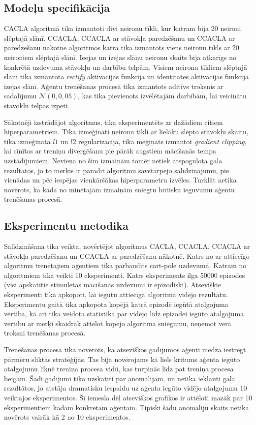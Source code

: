 \documentclass{ludis} %
\begin{document}
\subsection{Modeļu specifikācija}
CACLA algoritmā tika izmantoti divi neironu tīkli, kur katram bija 20
neironi slēptajā slānī. CCACLA, CCACLA ar stāvokļa paredzēšanu un CCACLA ar
paredzēšanu nākotnē algoritmos katrā tika izmantots viens neironu tīkls ar 20
neironiem slēptajā slānī. Ieejas un izejas slāņu neironu skaits bija atkarīgs no
konkrētā uzdevuma stāvokļu un darbību telpām. Visiem neironu tīkliem slēptajā
slānī tika izmantota \textit{rectify} aktivācijas funkcija un identitātes
aktivācijas funkcija izejas slānī. Aģentu trenēšanas procesā tika izmantots
aditīvs troksnis ar sadalījumu $\mathcal{N}(0, 0,05)$, kas tika pievienots
izvēlētajām darbībām, lai veicinātu stāvokļu telpas izpēti.

Sākotnēji izstrādājot algoritmus, tika eksperimentēts ar dažādiem citiem
hiperparametriem. Tika izmēģināti neironu tīkli ar lielāku slēpto stāvokļu
skaitu, tika izmēģināta $l1$ un $l2$ regularizācija, tika mēģināts izmantot
\textit{gradient clipping}, lai cīnītos ar treniņu diverģēšanu pie pārāk
augstiem mācīšanās tempa uzstādījumiem. Neviena no šīm izmaiņām tomēr netiek
atspoguļota gala rezultātos, jo to mērķis ir parādīt algoritmu savstarpējo
salīdzinājumu, pie vienādas un pēc iespējas vienkāršākas hiperparametru izvēles.
Turklāt netika novērots, ka kāda no minētajām izmaiņām sniegtu būtisku ieguvumu
aģentu trenēšanas procesā.


\subsection{Eksperimentu metodika}
Salīdzināšana tika veikta, novērtējot algoritmus CACLA, CCACLA, CCACLA ar
stāvokļa paredzēšanu un CCACLA ar paredzēšanu nākotnē. Katrs no ar attiecīgo
algoritmu trenētajiem aģentiem tika pārbaudīts cart-pole uzdevumā. Katram no
algoritmiem tika veikti 10 eksperimenti. Katrs eksperiments ilga 50000 epizodes
(visi apskatītie stimulētās mācīšanās uzdevumi ir epizodiski). Atsevišķie
eksperimenti tika apkopoti, lai iegūtu attiecīgā algoritma vidējo rezultātu.
Eksperimentu gaitā tika apkopota kopējā katrā epizodē iegūtā atalgojuma vērtība,
kā arī tika veidota statistika par vidējo līdz epizodei iegūto atalgojuma
vērtību ar mērķi skaidrāk attēlot kopējo algoritma sniegumu, neņemot vērā
troksni trenēšanas procesā.

Trenēšanas procesā tika novērots, ka atsevišķos gadījumos aģenti mēdza iestrēgt
pārmēru sliktās stratēģijās. Tas bija novērojams kā liels kritums aģenta iegūto
atalgojumu līknē treniņa procesa vidū, kas turpinās līdz pat treniņa procesa
beigām. Šādi gadījumi tika uzskatīti par anomālijām, un netika iekļauti gala
rezultātos, jo atstāja dramatisku iespaidu uz aģenta iegūto vidējo atalgojumu 10
veiktajos eksperimentos. Šī iemesla dēļ atsevišķos grafikos ir attēloti mazāk
par 10 eksperimentiem kādam konkrētam aģentam. Tipiski šādu anomāliju skaits
netika novērots vairāk kā 2 no 10 eksperimentos.
\end{document}
